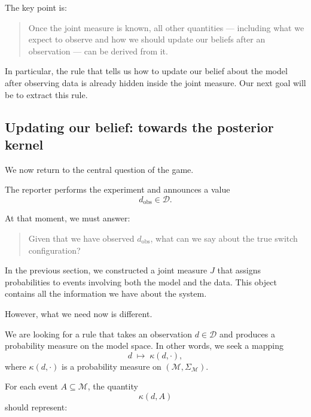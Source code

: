 \documentclass[11pt]{article}
\theoremstyle{remark}
\newcommand{\modelspace}{\mathcal{M}}
\newcommand{\dataspace}{\mathcal{D}}
\begin{document}
\vspace{2mm}

The key point is:

\begin{quote}
Once the joint measure is known, all other quantities --- including what we expect to observe and how we should update our beliefs after an observation --- can be derived from it.
\end{quote}

In particular, the rule that tells us how to update our belief about the model after observing data is already hidden inside the joint measure. Our next goal will be to extract this rule.


\subsection{Updating our belief: towards the posterior kernel}

We now return to the central question of the game.

\vspace{2mm}

The reporter performs the experiment and announces a value
\[
d_{\mathrm{obs}} \in \dataspace.
\]

At that moment, we must answer:

\begin{quote}
Given that we have observed \(d_{\mathrm{obs}}\), what can we say about the true switch configuration?
\end{quote}

\vspace{2mm}

In the previous section, we constructed a joint measure \(J\) that assigns probabilities to events involving both the model and the data. This object contains all the information we have about the system.

However, what we need now is different.

\vspace{2mm}

We are looking for a rule that takes an observation \(d \in \dataspace\) and produces a probability measure on the model space. In other words, we seek a mapping
\[
d \;\longmapsto\; \kappa(d,\cdot),
\]
where \(\kappa(d,\cdot)\) is a probability measure on \((\modelspace, \Sigma_{\modelspace})\).

For each event \(A \subseteq \modelspace\), the quantity
\[
\kappa(d,A)
\]
should represent:
\end{document}
